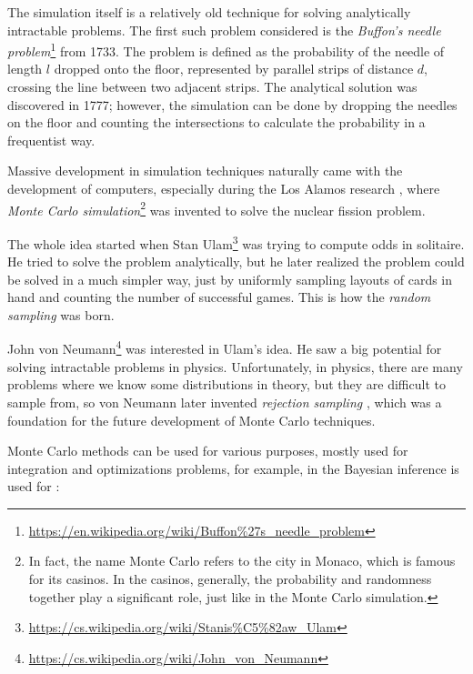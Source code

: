 \documentclass[
  digital, %
  oneside, %
  lof,     %
  lot,     %
]{fithesis4}
\begin{document}
The simulation itself is a relatively old technique for solving analytically intractable problems. 
The first such problem considered is the \textit{Buffon's needle problem}\footnote{\url{https://en.wikipedia.org/wiki/Buffon\%27s_needle_problem}} from 1733. 
The problem is defined as the probability of the needle of length $l$ dropped onto the floor, represented by parallel strips of distance $d$, crossing the line between two adjacent strips.
The analytical solution was discovered in 1777; however, the simulation can be done by dropping the needles on the floor and counting the intersections to calculate the probability in a frequentist way.

Massive development in simulation techniques naturally came with the development of computers, especially during the Los Alamos research \cite{metropolis1987}, where \textit{Monte Carlo simulation}\footnote{In fact, the name Monte Carlo refers to the city in Monaco, which is famous for its casinos. In the casinos, generally, the probability and randomness together play a significant role, just like in the Monte Carlo simulation.} was invented to solve the nuclear fission problem.

The whole idea started when Stan Ulam\footnote{\url{https://cs.wikipedia.org/wiki/Stanis\%C5\%82aw_Ulam}} was trying to compute odds in solitaire.
He tried to solve the problem analytically, but he later realized the problem could be solved in a much simpler way, just by uniformly sampling layouts of cards in hand and counting the number of successful games.
This is how the \textit{random sampling} was born.

John von Neumann\footnote{\url{https://cs.wikipedia.org/wiki/John_von_Neumann}} was interested in Ulam's idea. He saw a big potential for solving intractable problems in physics.
Unfortunately, in physics, there are many problems where we know some distributions in theory, but they are difficult to sample from, so von Neumann later invented \textit{rejection sampling} \cite{beichl2000}, which was a foundation for the future development of Monte Carlo techniques.

Monte Carlo methods can be used for various purposes, mostly used for integration and optimizations problems, for example, in the Bayesian inference is used for \cite{andrieu2003}:
\end{document}
